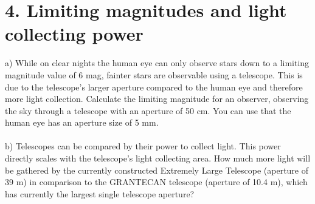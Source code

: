 \section*{4. Limiting magnitudes and light collecting power}

a) While on clear nights the human eye can only observe stars down to a limiting magnitude value of 6 mag,
fainter stars are observable using a telescope. This is due to the telescope's larger aperture compared
to the human eye and therefore more light collection. Calculate the limiting magnitude for an observer,
observing the sky through a telescope with an aperture of 50 cm. You can use that the human eye has an 
aperture size of 5 mm.\\
\\
b) Telescopes can be compared by their power to collect light. This power directly scales with the 
telescope's light collecting area. How much more light will be gathered by the currently constructed 
Extremely Large Telescope (aperture of 39 m) in comparison to the GRANTECAN telescope 
(aperture of 10.4 m), which has currently the largest single telescope aperture?\\
\\
